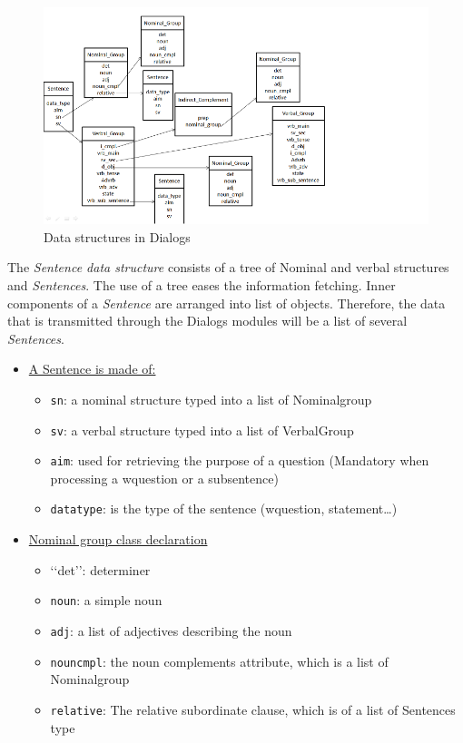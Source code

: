 \documentclass[twoside,a4paper,10pt]{report}
\newcommand{\dokuitalic}[1]{\textsl{#1}}
\newcommand{\dokumonospace}[1]{\texttt{#1}}
\newcommand{\dokuunderline}[1]{\underline{#1}}
\newcommand{\dokuitem}{\item}
\begin{document}
\begin{figure}[h]
\centering
\includegraphics[width=\linewidth]{data_structs.png}
\caption{Data structures in Dialogs}
\end{figure}


The \dokuitalic{Sentence data structure} consists of a tree of Nominal and verbal structures and \dokuitalic{Sentences}. The use of a tree eases the information fetching.
Inner components of a \dokuitalic{Sentence} are arranged into list of objects. Therefore, the data that is transmitted through the Dialogs modules will be a list of several \dokuitalic{Sentences}.


\begin{itemize}
\dokuitem  \dokuunderline{A Sentence is made of:}
\begin{itemize}
\dokuitem  \dokumonospace{sn}: a nominal structure typed into a list of Nominal{\textunderscore}group
\dokuitem  \dokumonospace{sv}: a verbal structure typed into a list of Verbal{\textunderscore}Group
\dokuitem  \dokumonospace{aim}: used for retrieving the purpose of a question (Mandatory when processing a w{\textunderscore}question or a subsentence)
\dokuitem  \dokumonospace{data{\textunderscore}type}: is the type of the sentence (w{\textunderscore}question, statement\ldots{})
\end{itemize}

\end{itemize}

\begin{itemize}
\dokuitem  \dokuunderline{Nominal group class declaration}
\begin{itemize}
\dokuitem  ‘‘det’’: determiner
\dokuitem  \dokumonospace{noun}: a simple noun
\dokuitem  \dokumonospace{adj}: a list of adjectives describing the noun
\dokuitem  \dokumonospace{noun{\textunderscore}cmpl}: the noun complements attribute, which is a list of Nominal{\textunderscore}group
\dokuitem  \dokumonospace{relative}: The relative subordinate clause, which is of a list of Sentences type
\end{itemize}

\end{itemize}
\end{document}
